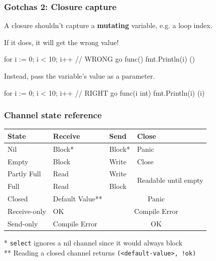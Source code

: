 \documentclass[compress,t,11pt]{beamer}
\begin{document}
\begin{frame}[fragile]
    \frametitle{Gotchas 2: Closure capture}
    A closure shouldn't capture a {\bf mutating} variable, e.g. a loop index. \par
    \vspace{0.6\baselineskip}
    If it does, it will get the wrong value! \par
    \vspace{0.2\baselineskip}
\begin{golang}
for i := 0; i < 10; i++ {   // WRONG
    go func() {
        fmt.Println(i)
    }()
}
\end{golang}
    Instead, \alert{pass the variable's value as a parameter}.
    \vspace{0.2\baselineskip}
\begin{golang}
for i := 0; i < 10; i++ {  // RIGHT
    go func(i int) {
        fmt.Println(i)
    }(i)
}
\end{golang}
\end{frame}

\begin{frame}[fragile]
\frametitle{Channel state reference}
{\renewcommand{\arraystretch}{1.5}
\begin{table}[h!]
  \begin{center}
    \begin{tabular}{l||l|l|l}%
      \textbf{State} & \textbf{Receive}  & \textbf{Send} & \textbf{Close}\\
      \hline\hline
      Nil & Block* & Block* & Panic \\
      \hline
      Empty & Block & Write & Close \\
      \hline
      Partly Full & Read & Write & \multirow{2}{*}{Readable until empty} \\
      \cline{1-3}
      Full & Read & Block \\
      \hline
      Closed & Default Value** & \multicolumn{2}{c}{Panic} \\
      \hline\hline
      Receive-only & OK & \multicolumn{2}{c}{Compile Error} \\
      \hline
      Send-only & Compile Error & \multicolumn{2}{c}{OK} \\
    \end{tabular}
  \end{center}
\end{table}
}
{\footnotesize
  * \verb|select| ignores a nil channel since it would always block \\
  ** Reading a closed channel returns \verb|(<default-value>, !ok)|
}
\end{frame}
\end{document}
